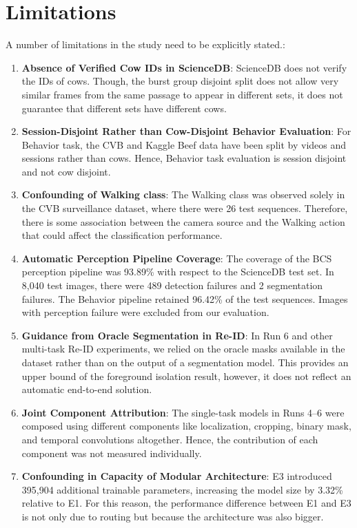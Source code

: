 \section{Limitations}

A number of limitations in the study need to be explicitly stated.:
\begin{enumerate}
    \item \textbf{Absence of Verified Cow IDs in ScienceDB}: ScienceDB does not verify the IDs of cows. Though, the burst group disjoint split does not allow very similar frames from the same passage to appear in different sets, it does not guarantee that different sets have different cows.
    \item \textbf{Session-Disjoint Rather than Cow-Disjoint Behavior Evaluation}: For Behavior task, the CVB and Kaggle Beef data have been split by videos and sessions rather than cows. Hence, Behavior task evaluation is session disjoint and not cow disjoint.
    \item \textbf{Confounding of Walking class}: The Walking class was observed solely in the CVB surveillance dataset, where there were 26 test sequences. Therefore, there is some association between the camera source and the Walking action that could affect the classification performance.
    \item \textbf{Automatic Perception Pipeline Coverage}: The coverage of the BCS perception pipeline was 93.89\% with respect to the ScienceDB test set. In 8,040 test images, there were 489 detection failures and 2 segmentation failures. The Behavior pipeline retained 96.42\% of the test sequences. Images with perception failure were excluded from our evaluation.
    \item \textbf{Guidance from Oracle Segmentation in Re-ID}: In Run 6 and other multi-task Re-ID experiments, we relied on the oracle masks available in the dataset rather than on the output of a segmentation model. This provides an upper bound of the foreground isolation result, however, it does not reflect an automatic end-to-end solution.
    \item \textbf{Joint Component Attribution}: The single-task models in Runs 4--6 were composed using different components like localization, cropping, binary mask, and temporal convolutions altogether. Hence, the contribution of each component was not measured individually.
    \item \textbf{Confounding in Capacity of Modular Architecture}: E3 introduced 395,904 additional trainable parameters, increasing the model size by 3.32\% relative to E1. For this reason, the performance difference between E1 and E3 is not only due to routing but because the architecture was also bigger.

\end{enumerate}

